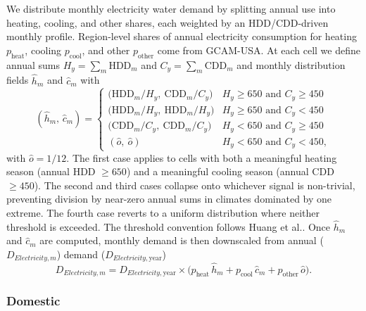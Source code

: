 \documentclass[fleqn,10pt]{wlscirep}
\begin{document}
We distribute monthly electricity water demand by splitting annual use into heating, cooling, and other shares, each weighted by an HDD/CDD-driven monthly profile. Region-level shares of annual electricity consumption for heating $p_{\mathrm{heat}}$, cooling $p_{\mathrm{cool}}$, and other $p_{\mathrm{other}}$ come from GCAM-USA. At each cell we define annual sums $H_y = \sum_m \text{HDD}_m$ and $C_y = \sum_m \text{CDD}_m$ and monthly distribution fields $\hat{h}_m$ and $\hat{c}_m$ with
\begin{equation}
(\hat{h}_m,\,\hat{c}_m) =
\begin{cases}
\big(\text{HDD}_m / H_y,\ \text{CDD}_m / C_y\big)      & H_y \ge 650 \text{ and } C_y \ge 450 \\[2pt]
\big(\text{HDD}_m / H_y,\ \text{HDD}_m / H_y\big)      & H_y \ge 650 \text{ and } C_y < 450 \\[2pt]
\big(\text{CDD}_m / C_y,\ \text{CDD}_m / C_y\big)      & H_y < 650 \text{ and } C_y \ge 450 \\[2pt]
(\hat{o},\ \hat{o})                                          & H_y < 650 \text{ and } C_y < 450,
\end{cases}
\label{eq:elec-cases}
\end{equation}
with $\hat{o} = 1/12$. 
The first case applies to cells with both a meaningful heating season (annual HDD $\ge 650$) and a meaningful cooling season (annual CDD $\ge 450$). The second and third cases collapse onto whichever signal is non-trivial, preventing division by near-zero annual sums in climates dominated by one extreme. The fourth case reverts to a uniform distribution where neither threshold is exceeded. The threshold convention follows Huang et al.\cite{Huang2018}. Once $\hat{h}_m$ and $\hat{c}_m$ are computed, monthly demand is then downscaled from annual ($D_{Electricity,m}$) demand ($D_{Electricity,\mathrm{year}}$)
\begin{equation}
D_{Electricity,m} = D_{Electricity,\mathrm{year}} \times \big(p_{\mathrm{heat}}\,\hat{h}_m + p_{\mathrm{cool}}\,\hat{c}_m + p_{\mathrm{other}}\,\hat{o}\big).
\label{eq:elec-demand}
\end{equation}


\subsubsection*{Domestic}
\end{document}
